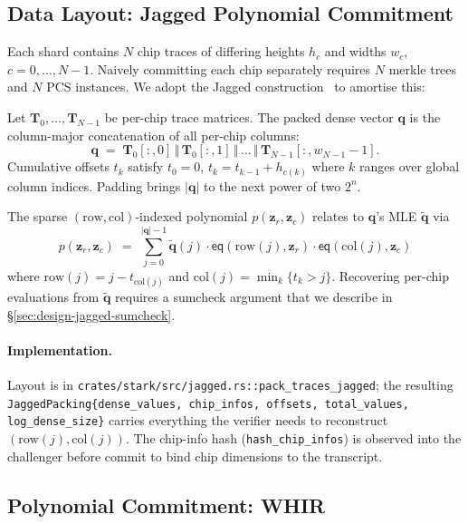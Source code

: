 \subsection{Data Layout: Jagged Polynomial Commitment}
\label{sec:design-jagged}

Each shard contains $N$ chip traces of differing heights $h_c$ and
widths $w_c$, $c = 0, \ldots, N-1$.  Naively committing each chip
separately requires $N$ merkle trees and $N$ PCS instances.  We
adopt the Jagged construction~\cite{jagged} to amortise this:

\begin{construction}
\label{cons:jagged-pack}
Let $\mathbf{T}_0, \ldots, \mathbf{T}_{N-1}$ be per-chip trace
matrices.  The packed dense vector $\mathbf{q}$ is the column-major
concatenation of all per-chip columns:
\[
  \mathbf{q} \;=\;
  \mathbf{T}_0[:,0] \,\Vert\, \mathbf{T}_0[:,1] \,\Vert\, \ldots
   \,\Vert\, \mathbf{T}_{N-1}[:,w_{N-1}-1].
\]
Cumulative offsets $t_k$ satisfy $t_0 = 0$, $t_k = t_{k-1} +
h_{c(k)}$ where $k$ ranges over global column indices.  Padding
brings $|\mathbf{q}|$ to the next power of two $2^n$.
\end{construction}

The sparse $(\mathrm{row}, \mathrm{col})$-indexed polynomial $p(\mathbf{z}_r,
\mathbf{z}_c)$ relates to $\mathbf{q}$'s MLE $\widetilde{\mathbf{q}}$ via
\[
  p(\mathbf{z}_r, \mathbf{z}_c) \;=\;
  \sum_{j=0}^{|\mathbf{q}|-1}
    \widetilde{\mathbf{q}}(j) \cdot
    \mathsf{eq}(\mathrm{row}(j), \mathbf{z}_r) \cdot
    \mathsf{eq}(\mathrm{col}(j), \mathbf{z}_c)
\]
where $\mathrm{row}(j) = j - t_{\mathrm{col}(j)}$ and
$\mathrm{col}(j) = \min_k\{t_k > j\}$.  Recovering per-chip
evaluations from $\widetilde{\mathbf{q}}$ requires a sumcheck
argument that we describe in \S\ref{sec:design-jagged-sumcheck}.

\paragraph{Implementation.}
Layout is in \texttt{crates/stark/src/jagged.rs::pack\_traces\_jagged};
the resulting \texttt{JaggedPacking\{dense\_values, chip\_infos,
offsets, total\_values, log\_dense\_size\}} carries everything the
verifier needs to reconstruct $(\mathrm{row}(j), \mathrm{col}(j))$.
The chip-info hash (\texttt{hash\_chip\_infos}) is observed into the
challenger before commit to bind chip dimensions to the transcript.

\subsection{Polynomial Commitment: WHIR}
\label{sec:design-whir}

